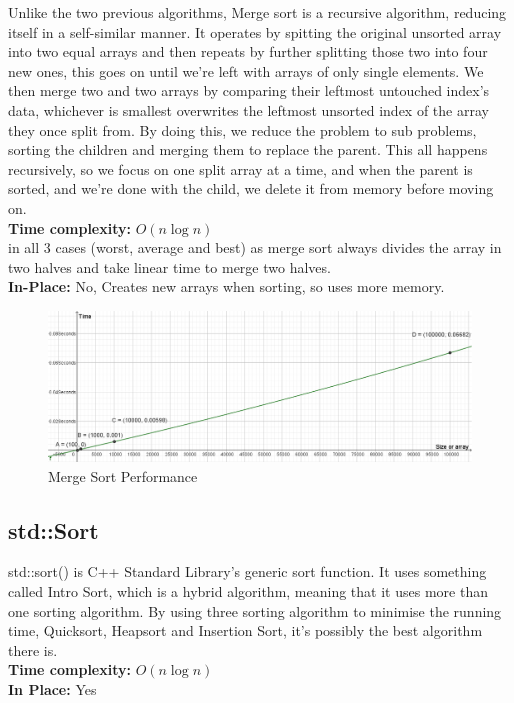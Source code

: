 \documentclass{article}
\begin{document}
Unlike the two previous algorithms, Merge sort is a recursive algorithm, reducing itself in a self-similar manner. It operates by spitting the original unsorted array into two equal arrays and then repeats by further splitting those two into four new ones, this goes on until we're left with arrays of only single elements. We then merge two and two arrays by comparing their leftmost untouched index's data, whichever is smallest overwrites the leftmost unsorted index of the array they once split from. By doing this, we reduce the problem to sub problems, sorting the children and merging them to replace the parent. This all happens recursively, so we focus on one split array at a time, and when the parent is sorted, and we're done with the child, we delete it from memory before moving on.
\\
\textbf{Time complexity:} $O(n\log n)$\\
in all 3 cases (worst, average and best) as merge sort always divides the array in two halves and take linear time to merge two halves.
\\
\textbf{In-Place:} No, Creates new arrays when sorting, so uses more memory.

\begin{figure}[h]
	\centering
	\includegraphics[width=1\linewidth]{"images/Merge Sort"}
	\caption{Merge Sort Performance}
	\label{fig:merge-sort}
\end{figure}


\newpage

\subsection{std::Sort}

std::sort() is C++ Standard Library's generic sort function. It uses something called Intro Sort, which is a hybrid algorithm, meaning that it uses more than one sorting algorithm. By using three sorting algorithm to minimise the running time, Quicksort, Heapsort and Insertion Sort, it's possibly the best algorithm there is.
\\
\textbf{Time complexity:} $O(n\log n)$
\\
\textbf{In Place:} Yes
\end{document}
